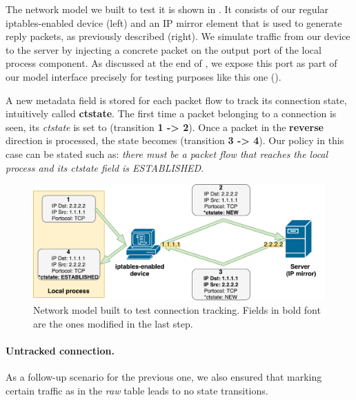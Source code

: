 The network model we built to test it is shown in
.  It consists of our regular
iptables-enabled device (left) and an IP mirror element that is used to
generate reply packets, as previously described (right).  We simulate traffic
from our device to the server by injecting a concrete packet on the output port
of the local process component.  As discussed at the end of
, we expose this port as part of our
model interface precisely for testing purposes like this one
().

A new metadata field is stored for each packet flow to track its connection
state, intuitively called \textbf{ctstate}.  The first time a packet belonging
to a connection is seen, its \emph{ctstate} is set to \NEW (transition
\textbf{1 -> 2}).  Once a packet in the \textbf{reverse} direction is
processed, the state becomes \ESTABLISHED (transition \textbf{3 -> 4}).  Our
policy in this case can be stated such as: \emph{there must be a packet flow
that reaches the local process and its ctstate field is ESTABLISHED}.

\begin{figure}[h]
  \centering
  \captionsetup{justification=centering}
  \includegraphics[scale=0.5]{src/img/state-switch}
  \caption[Network model built to test connection tracking.]{Network model
  built to test connection tracking. Fields in bold font are the ones modified
  in the last step.}
  \label{fig:state-switch}
\end{figure}

\paragraph{Untracked connection.}
As a follow-up scenario for the previous one, we also ensured that marking
certain traffic as \UNTRACKED in the \emph{raw} table leads to no state
transitions.

\bigskip

